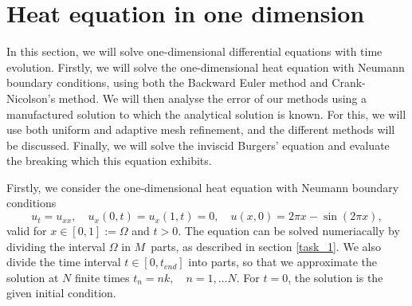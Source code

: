 \section{Heat equation in one dimension}
In this section, we will solve one-dimensional differential equations with time evolution. 
Firstly, we will solve the one-dimensional heat equation with Neumann boundary conditions, using both the Backward Euler method and Crank-Nicolson's method.
We will then analyse the error of our methods using a manufactured solution to which the analytical solution is known.
For this, we will use both uniform and adaptive mesh refinement, and the different methods will be discussed.
Finally, we will solve the inviscid Burgers' equation and evaluate the breaking which this equation exhibits.

Firstly, we consider the one-dimensional heat equation with Neumann boundary conditions
\begin{equation*}
    u_t = u_{xx}, \quad u_x(0,t) = u_x(1,t) = 0, \quad u(x,0) = 2\pi x - \sin(2\pi x),
\end{equation*}
valid for $x \in [0,1] := \Omega$ and $t > 0$.
The equation can be solved numeriacally by dividing the interval $\Omega$ in $M$ parts, as described in section \ref{task_1}.
We also divide the time interval $t \in [0,t_{end}]$ into parts, so that we approximate the solution at $N$ finite times $t_n = nk, \quad n = 1, \ldots N$.
For $t = 0$, the solution is the given initial condition.

\begin{figure}[h]
    \centering
    
\end{figure}



\begin{figure}[h]
    \centering
    
\end{figure}

\begin{figure}[h]
    \centering
    
\end{figure}

\begin{figure}[h]
    \centering
    
\end{figure}


